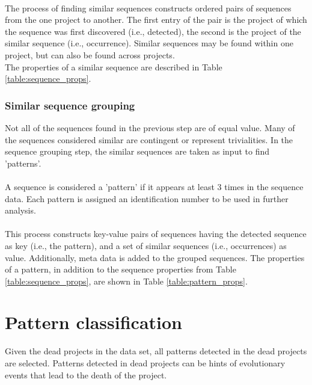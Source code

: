 \paragraph{}
The process of finding similar sequences constructs ordered pairs of sequences
from the one project to another. The first entry of the pair is the project
of which the sequence was first discovered (i.e., detected), the second is the
project of the similar sequence (i.e., occurrence). Similar sequences may be
found within one project, but can also be found across projects.\\

\noindent
The properties of a similar sequence are described in Table
\ref{table:sequence_props}.



\subsubsection{Similar sequence grouping}
\label{def:pattern}
Not all of the sequences found in the previous step are of equal value. Many of
the sequences considered similar are contingent or represent trivialities. In
the sequence grouping step, the similar sequences are taken as input to find
'patterns'.

\paragraph{}
A sequence is considered a 'pattern' if it appears at least 3 times in the
sequence data. Each pattern is assigned an identification number to be used in
further analysis.

\paragraph{}
This process constructs key-value pairs of sequences having the detected
sequence as key (i.e., the pattern), and a set of similar sequences (i.e.,
occurrences) as value. Additionally, meta data is added to the grouped
sequences. The properties of a pattern, in addition to the sequence properties
from Table \ref{table:sequence_props}, are shown in Table
\ref{table:pattern_props}.



\section{Pattern classification}
\label{section:patterns_dead}
Given the dead projects in the data set, all patterns detected in the dead
projects are selected. Patterns detected in dead projects can be hints of
evolutionary events that lead to the death of the project.

